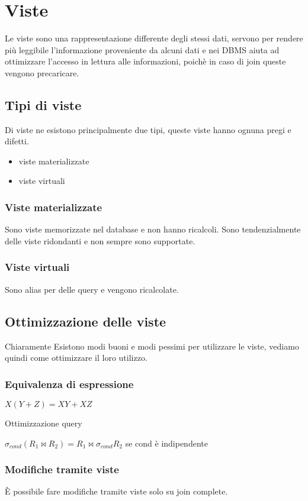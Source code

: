 \chapter{Viste}\label{chap:viste}

Le viste sono una rappresentazione differente degli stessi dati, servono per rendere più leggibile l'informazione proveniente da alcuni dati e nei DBMS aiuta ad ottimizzare l'accesso in lettura alle informazioni, poichè in caso di join queste vengono precaricare.

\section{Tipi di viste}

Di viste ne esistono principalmente due tipi, queste viste hanno ognuna pregi e difetti.

\begin{itemize}
    \item viste materializzate
    \item viste virtuali
\end{itemize}

\subsection{Viste materializzate}
Sono viste memorizzate nel database e non hanno ricalcoli. Sono tendenzialmente delle viste ridondanti e non sempre sono supportate.

\subsection{Viste virtuali}
Sono alias per delle query e vengono ricalcolate.

\section{Ottimizzazione delle viste}

Chiaramente Esistono modi buoni e modi pessimi per utilizzare le viste, vediamo quindi come ottimizzare il loro utilizzo.

\subsection{Equivalenza di espressione}

$X(Y+Z) = X Y + X Z$

Ottimizzazione query

$ \sigma _{cond} \left( R_1 \bowtie  R_2 \right) = R_1 \bowtie \sigma _{cond} R_2$ se cond è indipendente




\subsection{Modifiche tramite viste}
È possibile fare modifiche tramite viste solo su join complete.